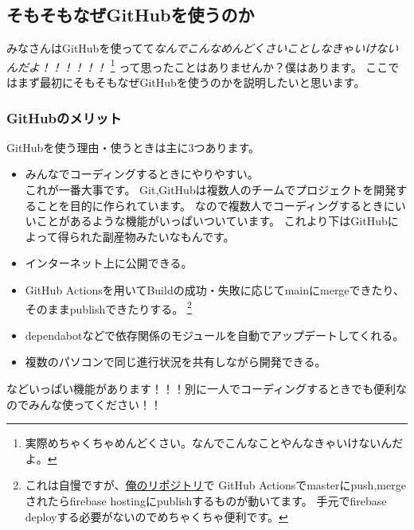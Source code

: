 \documentclass[a4paper]{ltjsreport}
\begin{document}
\subsection{そもそもなぜGitHubを使うのか}
みなさんはGitHubを使ってて\emph{なんでこんなめんどくさいことしなきゃいけないんだよ！！！！！！}
\footnote{実際めちゃくちゃめんどくさい。なんでこんなことやんなきゃいけないんだよ。}
って思ったことはありませんか？僕はあります。
ここではまず最初にそもそもなぜGitHubを使うのかを説明したいと思います。
\subsubsection{GitHubのメリット}
GitHubを使う理由・使うときは主に3つあります。
\begin{itemize}
  \item みんなでコーディングするときにやりやすい。\\
        これが一番大事です。
        Git,GitHubは複数人のチームでプロジェクトを開発することを目的に作られています。
        なので複数人でコーディングするときにいいことがあるような機能がいっぱいついています。
        これより下はGitHubによって得られた副産物みたいなもんです。
  \item インターネット上に公開できる。
  \item GitHub Actionsを用いてBuildの成功・失敗に応じてmainにmergeできたり、そのままpublishできたりする。
        \footnote{これは自慢ですが、\href{https://github.com/akimasa-l/hide4063}{俺のリポジトリ}で
          GitHub Actionsでmasterにpush,mergeされたらfirebase hostingにpublishするものが動いてます。
          手元でfirebase deployする必要がないのでめちゃくちゃ便利です。}
  \item dependabotなどで依存関係のモジュールを自動でアップデートしてくれる。
  \item 複数のパソコンで同じ進行状況を共有しながら開発できる。
\end{itemize}
などいっぱい機能があります！！！別に一人でコーディングするときでも便利なのでみんな使ってください！！
\end{document}
